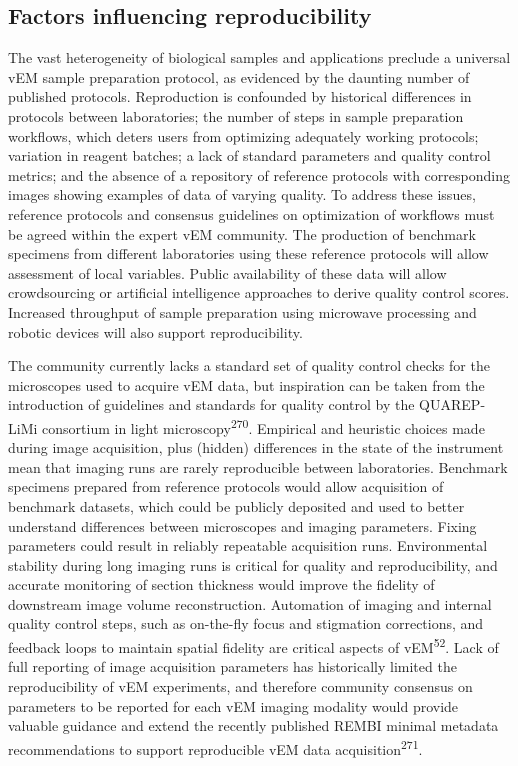 \documentclass{article}
\begin{document}
\subsection*{Factors influencing reproducibility}

The vast heterogeneity of biological samples and applications preclude a universal vEM sample preparation protocol, as evidenced by the daunting number of published protocols. Reproduction is confounded by historical differences in protocols between laboratories; the number of steps in sample preparation workflows, which deters users from optimizing adequately working protocols; variation in reagent batches; a lack of standard parameters and quality control metrics; and the absence of a repository of reference protocols with corresponding images showing examples of data of varying quality. To address these issues, reference protocols and consensus guidelines on optimization of workflows must be agreed within the expert vEM community. The production of benchmark specimens from different laboratories using these reference protocols will allow assessment of local variables. Public availability of these data will allow crowdsourcing or artificial intelligence approaches to derive quality control scores. Increased throughput of sample preparation using microwave processing and robotic devices will also support reproducibility.

The community currently lacks a standard set of quality control checks for the microscopes used to acquire vEM data, but inspiration can be taken from the introduction of guidelines and standards for quality control by the QUAREP-LiMi consortium in light microscopy\textsuperscript{270}. Empirical and heuristic choices made during image acquisition, plus (hidden) differences in the state of the instrument mean that imaging runs are rarely reproducible between laboratories. Benchmark specimens prepared from reference protocols would allow acquisition of benchmark datasets, which could be publicly deposited and used to better understand differences between microscopes and imaging parameters. Fixing parameters could result in reliably repeatable acquisition runs. Environmental stability during long imaging runs is critical for quality and reproducibility, and accurate monitoring of section thickness would improve the fidelity of downstream image volume reconstruction. Automation of imaging and internal quality control steps, such as on-the-fly focus and stigmation corrections, and feedback loops to maintain spatial fidelity are critical aspects of vEM\textsuperscript{52}. Lack of full reporting of image acquisition parameters has historically limited the reproducibility of vEM experiments, and therefore community consensus on parameters to be reported for each vEM imaging modality would provide valuable guidance and extend the recently published REMBI minimal metadata recommendations to support reproducible vEM data acquisition\textsuperscript{271}.
\end{document}
